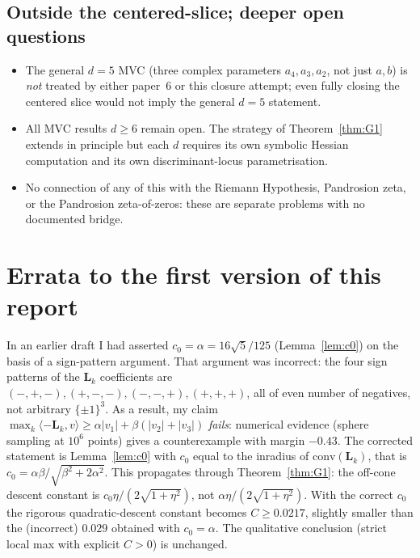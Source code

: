 \documentclass[11pt,a4paper]{article}
\begin{document}
\subsection*{Outside the centered-slice; deeper open questions}

\begin{itemize}
\item The general $d=5$ MVC (three complex parameters $a_4,a_3,a_2$,
  not just $a,b$) is \emph{not} treated by either paper~6 or this
  closure attempt; even fully closing the centered slice would not
  imply the general $d=5$ statement.
\item All MVC results $d\ge 6$ remain open. The strategy of
  Theorem~\ref{thm:G1} extends in principle but each $d$ requires its
  own symbolic Hessian computation and its own discriminant-locus
  parametrisation.
\item No connection of any of this with the Riemann Hypothesis,
  Pandrosion zeta, or the Pandrosion zeta-of-zeros: these are
  separate problems with no documented bridge.
\end{itemize}

\section{Errata to the first version of this report}
\label{sec:errata}

In an earlier draft I had asserted $c_0=\alpha=16\sqrt 5/125$
(Lemma~\ref{lem:c0}) on the basis of a sign-pattern argument.
That argument was incorrect: the four sign patterns of the $\mathbf
L_k$ coefficients are
$(-,+,-),(+,-,-),(-,-,+),(+,+,+)$, all of even number of negatives,
not arbitrary $\{\pm 1\}^3$. As a result, my claim
$\max_k\langle-\mathbf L_k,v\rangle\ge \alpha|v_1|+\beta(|v_2|+|v_3|)$
\emph{fails}: numerical evidence (sphere sampling at $10^6$ points)
gives a counterexample with margin $-0.43$. The corrected statement is
Lemma~\ref{lem:c0} with $c_0$ equal to the inradius of
$\mathrm{conv}(\mathbf L_k)$, that is
$c_0 = \alpha\beta/\sqrt{\beta^2+2\alpha^2}$.
This propagates through Theorem~\ref{thm:G1}: the off-cone descent
constant is $c_0\eta/(2\sqrt{1+\eta^2})$, not $\alpha\eta/(2\sqrt{1+\eta^2})$.
With the correct $c_0$ the rigorous quadratic-descent constant becomes
$C\ge 0.0217$, slightly smaller than the (incorrect)
$0.029$ obtained with $c_0=\alpha$. The qualitative conclusion
(strict local max with explicit $C>0$) is unchanged.
\end{document}
